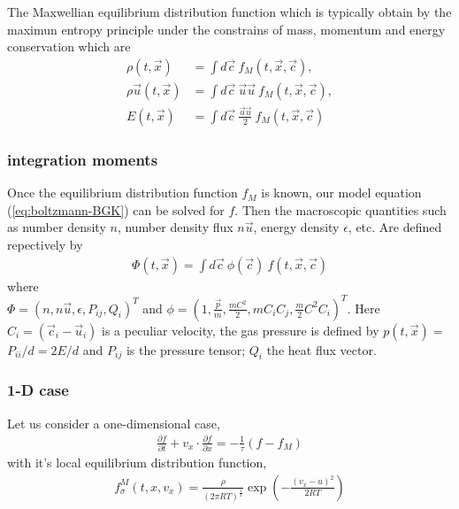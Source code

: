 \begin{frame} 
	The Maxwellian equilibrium distribution function which is typically obtain by the maximun entropy principle under the constrains of mass, momentum and energy conservation which are
	\begin{align}
	\rho(t,\vec{x}) 				&= \int d\vec{c} \ f_M(t,\vec{x},\vec{c}), \\
	\rho \vec{u}(t,\vec{x}) &= \int d\vec{c} \ \vec{u}\vec{u} \ f_M(t,\vec{x},\vec{c}), \\
	E(t,\vec{x}) 						&= \int d\vec{c} \ \frac{\vec{u}\vec{u}}{2} \ f_M(t,\vec{x},\vec{c})
	\end{align}
\end{frame}

\begin{frame} \frametitle{integration moments}
	Once the equilibrium distribution function $f_M$ is known, our model equation (\ref{eq:boltzmann-BGK}) can be solved for $f$. Then the macroscopic quantities such as number density $n$, number density flux $n\vec{u}$, energy density $\epsilon$, etc. Are defined repectively by 
	\begin{align}
	\Phi(t,\vec{x}) = \int d\vec{c} \ \phi(\vec{c}) \ f(t,\vec{x},\vec{c})
	\end{align}
	where \\ $\Phi = (n ,n\vec{u},\epsilon,P_{ij},Q_{i})^T$ and $\phi = (1,\frac{\vec{p}}{m}, \frac{mC^2}{2},mC_iC_j,\frac{m}{2}C^2C_i)^T$. Here $C_i = (\vec{c}_i-\vec{u}_i)$ is a peculiar velocity, the gas pressure is defined by $p(t,\vec{x}) =$ $P_{ii}/d = 2E/d$ and $P_{ij}$ is the pressure tensor; $Q_i$ the heat flux vector.
\end{frame}

\begin{frame} \frametitle{1-D case}
	Let us consider a one-dimensional case,
	\begin{align}
	\frac{\partial{f}}{\partial{t}} + 
	v_x\cdot\frac{\partial f}{\partial x} =
	- \frac{1}{\tau} (f-f_M)
	\label{eq:1d_boltzmannBGK}
	\end{align}
	with it's local equilibrium distribution function,
	\begin{align}
	f_\sigma^{M}(t,x,v_x)= \frac{\rho}{(2 \pi RT)^{\frac{1}{2}}} \exp\left(-{\frac{(v_x-u)^2}{2 R T}} \right)
	\end{align}
\end{frame}

